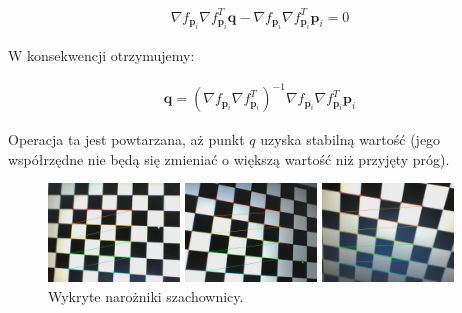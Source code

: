 \documentclass[oneside, eng]{mgr}
\newcommand{\bb}{\textbf}
\begin{document}
\begin{align*}
	\nabla f_{\bb{p}_i} \nabla f_{\bb{p}_i}^T \bb{q} - \nabla f_{\bb{p}_i} \nabla f_{\bb{p}_i}^T \bb{p}_i = 0
\end{align*}

W konsekwencji otrzymujemy:

\begin{align}
	\bb{q} = (\nabla f_{\bb{p}_i} \nabla f_{\bb{p}_i}^T)^{-1} \nabla f_{\bb{p}_i} \nabla f_{\bb{p}_i}^T \bb{p}_i
\end{align}

Operacja ta jest powtarzana, aż punkt $q$ uzyska stabilną wartość (jego współrzędne nie będą się zmieniać o większą wartość niż przyjęty próg).

\begin{figure}
\centering
		\begin{minipage}{3.5cm}
			\includegraphics[width=3.5cm]{left1.jpg}
		\end{minipage}
		\begin{minipage}{3.5cm}
			\includegraphics[width=3.5cm]{left10.jpg}
		\end{minipage}
		\begin{minipage}{3.5cm}
			\includegraphics[width=3.5cm]{left27.jpg}
		\end{minipage}
	\caption{Wykryte narożniki szachownicy. }
	\label{fig:corners}
\end{figure}
\end{document}
